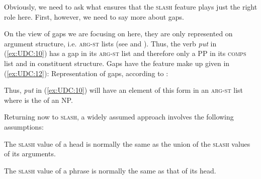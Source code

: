 \documentclass[output=paper,biblatex,babelshorthands,newtxmath,draftmode,colorlinks,citecolor=brown]{langscibook}
\begin{document}

Obviously, we need to ask what ensures that the \textsc{slash} feature plays just
the right role here. First, however, we need to say more about gaps.

On the view of gaps we are focusing on here, they are only represented
on argument structure, i.e. 
\textsc{arg-st} lists (see  and ). Thus, the verb \emph{put} in (\ref{ex:UDC:10})
 has a gap in its
\textsc{arg-st} list and therefore only a PP in its \textsc{comps} list and
in constituent structure. Gaps have the feature make up given in
(\ref{ex:UDC:12}):
\ea
\label{ex:UDC:12}
Representation of gaps, according to \citet[161]{Pollard:Sag:94}:\\
\z  


\noindent
Thus, \emph{put} in (\ref{ex:UDC:10}) will have an element of this
form in an \textsc{arg-st} list where  is the \localv of an
NP.

Returning now to \textsc{slash}, a widely assumed approach involves the following
assumptions:

\eal
\label{ex:UDC:13}
\ex
The \textsc{slash} value of a head is normally the same as the union of the \textsc{slash} values of its
arguments.

\ex
The \textsc{slash} value of a phrase is normally the same as that of its head.
\zl
\end{document}
